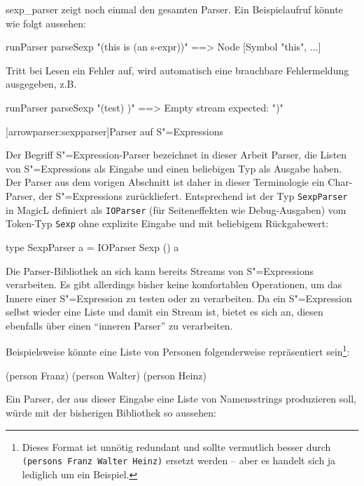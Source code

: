 \documentclass[12pt, a4paper, bibgerm]{scrbook}
\newenvironment{DIFnomarkup}{}{}
\newcommand\icode[1]{\lstinline?#1?}
\newcommand\lsection{}
\newcommand\abb{}
\newcommand{\sexp}{S"=Expression}
\newcommand{\sexps}{S"=Expressions}
\begin{document}
\abb{sexp_parser} zeigt noch einmal den gesamten Parser. Ein
Beispielaufruf könnte wie folgt aussehen:
\begin{code}
runParser parseSexp "(this is (an s-expr))"  ==> Node [Symbol "this", ...]
\end{code}
Tritt bei Lesen ein Fehler auf, wird automatisch eine brauchbare
Fehlermeldung ausgegeben, z.B.
\begin{DIFnomarkup}\begin{code}
runParser parseSexp "(test) )"  ==>  Empty stream expected: ")"
\end{code}\end{DIFnomarkup}

\lsection[arrowparser:sexpparser]{Parser auf \sexps}

Der Begriff \sexp{}-Parser bezeichnet in dieser Arbeit Parser, die
Listen von \sexps{} als Eingabe und einen beliebigen Typ als Ausgabe
haben. Der Parser aus dem vorigen Abschnitt ist daher in dieser
Terminologie ein Char-Parser, der \sexps{} zurückliefert. Entsprechend
ist der Typ \icode{SexpParser} in MagicL definiert als \icode{IOParser} (für
Seiteneffekten wie Debug-Ausgaben) vom Token-Typ \icode{Sexp} ohne
explizite Eingabe und mit beliebigem Rückgabewert:
\begin{DIFnomarkup}\begin{code}
type SexpParser a = IOParser Sexp () a  
\end{code}\end{DIFnomarkup}
Die Parser-Bibliothek an sich kann bereits Streams von \sexps{}
verarbeiten. Es gibt allerdings bisher keine komfortablen Operationen,
um das Innere einer \sexp{} zu testen oder zu verarbeiten. Da ein
\sexp{} selbst wieder eine Liste und damit ein Stream ist, bietet es
sich an, diesen ebenfalls über einen "`inneren Parser"' zu verarbeiten.

Beispielsweise könnte eine Liste von Personen folgenderweise
repräsentiert sein\footnote{Dieses Format ist unnötig redundant und
  sollte vermutlich besser durch \icode{(persons Franz Walter Heinz)}
  ersetzt werden -- aber es handelt sich ja lediglich um ein Beispiel.}:
\begin{DIFnomarkup}\begin{code}
(person Franz)
(person Walter)
(person Heinz)
\end{code}\end{DIFnomarkup}

Ein Parser, der aus dieser Eingabe eine Liste von Namensstrings
produzieren soll, würde mit der bisherigen Bibliothek so aussehen:
\end{document}
